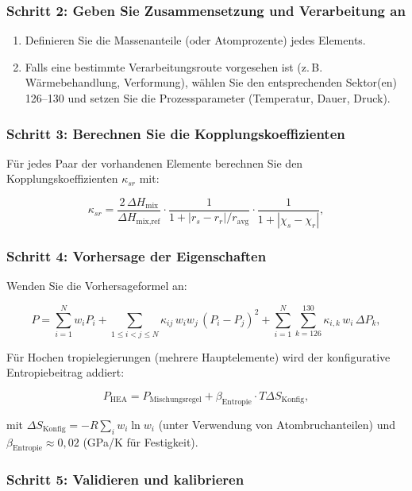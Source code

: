 \documentclass[12pt,a4paper]{article}
\begin{document}
\subsubsection{Schritt 2: Geben Sie Zusammensetzung und Verarbeitung an}

\begin{enumerate}
	\item Definieren Sie die Massenanteile (oder Atomprozente) jedes Elements.
	\item Falls eine bestimmte Verarbeitungsroute vorgesehen ist (z. B. Wärmebehandlung, Verformung), wählen Sie den entsprechenden Sektor(en) 126–130 und setzen Sie die Prozessparameter (Temperatur, Dauer, Druck).
\end{enumerate}

\subsubsection{Schritt 3: Berechnen Sie die Kopplungskoeffizienten}

Für jedes Paar der vorhandenen Elemente berechnen Sie den Kopplungskoeffizienten \(\kappa_{sr}\) mit:

\[
\kappa_{sr} = \frac{2\,\Delta H_{\text{mix}}}{\Delta H_{\text{mix,ref}}} \cdot
\frac{1}{1 + |r_s - r_r|/r_{\text{avg}}} \cdot
\frac{1}{1 + |\chi_s - \chi_r|},
\]

\subsubsection{Schritt 4: Vorhersage der Eigenschaften}

Wenden Sie die Vorhersageformel an:

\[
P = \sum_{i=1}^{N} w_i P_i
+ \sum_{1\le i<j\le N} \kappa_{ij}\, w_i w_j\, (P_i - P_j)^2
+ \sum_{i=1}^{N} \sum_{k=126}^{130} \kappa_{i,k}\, w_i\, \Delta P_k,
\]

Für Hochen tropielegierungen (mehrere Hauptelemente) wird der konfigurative Entropiebeitrag addiert:

\[
P_{\text{HEA}} = P_{\text{Mischungsregel}} + \beta_{\text{Entropie}} \cdot T \Delta S_{\text{Konfig}},
\]

mit \(\Delta S_{\text{Konfig}} = -R \sum_i w_i \ln w_i\) (unter Verwendung von Atombruchanteilen) und \(\beta_{\text{Entropie}} \approx 0,02\) (GPa/K für Festigkeit).

\subsubsection{Schritt 5: Validieren und kalibrieren}
\end{document}
